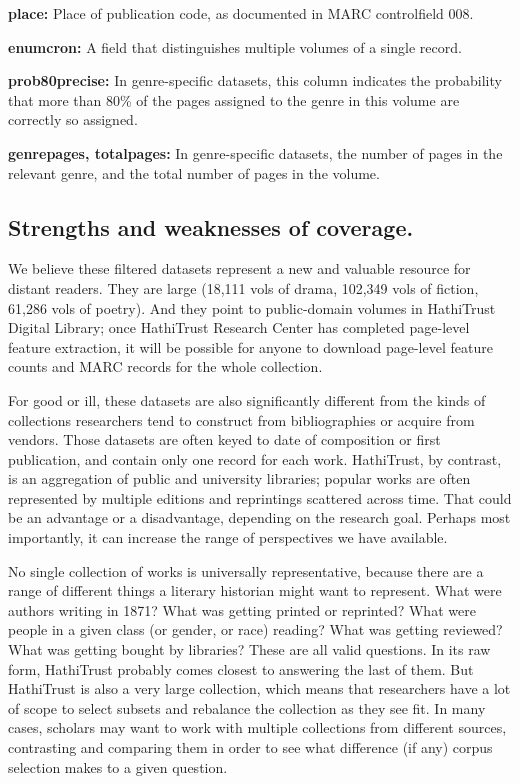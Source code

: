 \documentclass[paper=a4, fontsize=12pt]{scrartcl}
\numberwithin{equation}{section}		%
\numberwithin{figure}{section}			%
\numberwithin{table}{section}				%
\begin{document}
\noindent \textbf{place:} Place of publication code, as documented in MARC controlfield 008.

\noindent \textbf{enumcron:} A field that distinguishes multiple volumes of a single record.

\noindent \textbf{prob80precise:} In genre-specific datasets, this column indicates the probability that more than 80\% of the pages assigned to the genre in this volume are correctly so assigned.

\noindent \textbf{genrepages, totalpages:} In genre-specific datasets, the number of pages in the relevant genre, and the total number of pages in the volume.

\subsection{Strengths and weaknesses of coverage.}

We believe these filtered datasets represent a new and valuable resource for distant readers. They are large (18,111 vols of drama, 102,349 vols of fiction, 61,286 vols of poetry). And they point to public-domain volumes in HathiTrust Digital Library; once HathiTrust Research Center has completed page-level feature extraction, it will be possible for anyone to download page-level feature counts and MARC records for the whole collection.

For good or ill, these datasets are also significantly different from the kinds of collections researchers tend to construct from bibliographies or acquire from vendors. Those datasets are often keyed to date of composition or first publication, and contain only one record for each work. HathiTrust, by contrast, is an aggregation of public and university libraries; popular works are often represented by multiple editions and reprintings scattered across time. That could be an advantage or a disadvantage, depending on the research goal. Perhaps most importantly, it can increase the range of perspectives we have available.

No single collection of works is universally representative, because there are a range of different things a literary historian might want to represent. What were authors writing in 1871? What was getting printed or reprinted? What were people in a given class (or gender, or race) reading? What was getting reviewed? What was getting bought by libraries? These are all valid questions. In its raw form, HathiTrust probably comes closest to answering the last of them. But HathiTrust is also a very large collection, which means that researchers have a lot of scope to select subsets and rebalance the collection as they see fit. In many cases, scholars may want to work with multiple collections from different sources, contrasting and comparing them in order to see what difference (if any) corpus selection makes to a given question. 
\end{document}
